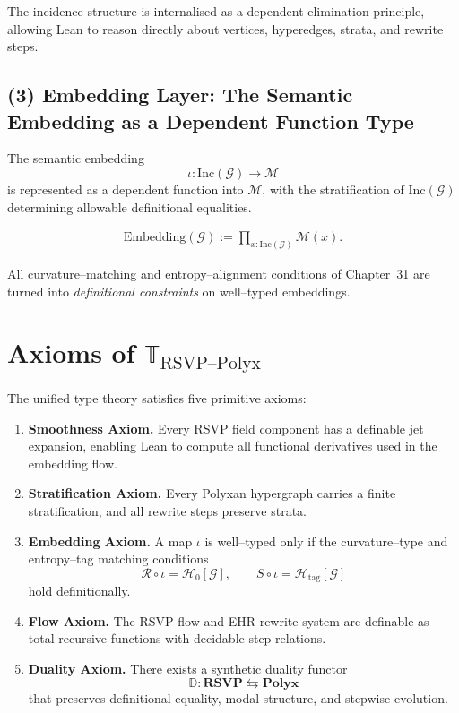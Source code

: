 The incidence structure is internalised as a dependent elimination principle,
allowing Lean to reason directly about vertices, hyperedges, strata, and rewrite steps.

\subsection{(3) Embedding Layer: The Semantic Embedding as a Dependent Function Type}

The semantic embedding
\[
\iota : \mathrm{Inc}(\mathcal{G})\to\mathcal{M}
\]
is represented as a dependent function into $\mathcal{M}$,
with the stratification of $\mathrm{Inc}(\mathcal{G})$ determining allowable definitional equalities.

\begin{align}
\mathrm{Embedding}(\mathcal{G})
  := \prod_{x:\mathrm{Inc}(\mathcal{G})} \mathcal{M}(x).
\end{align}

All curvature--matching and entropy--alignment conditions of Chapter~31
are turned into \emph{definitional constraints} on well--typed embeddings.

\section{Axioms of $\mathbb{T}_{\mathrm{RSVP\text{--}Polyx}}$}

The unified type theory satisfies five primitive axioms:

\begin{enumerate}
\item \textbf{Smoothness Axiom.}  
Every RSVP field component has a definable jet expansion, enabling Lean to compute all functional derivatives used in the embedding flow.

\item \textbf{Stratification Axiom.}  
Every Polyxan hypergraph carries a finite stratification, and all rewrite steps preserve strata.

\item \textbf{Embedding Axiom.}  
A map $\iota$ is well--typed only if the curvature--type and entropy--tag matching conditions
\[
\mathcal{R}\circ\iota = \mathcal{H}_0[\mathcal{G}],\qquad
S\circ\iota = \mathcal{H}_{\mathrm{tag}}[\mathcal{G}]
\]
hold definitionally.

\item \textbf{Flow Axiom.}  
The RSVP flow and EHR rewrite system are definable as total recursive functions with decidable step relations.

\item \textbf{Duality Axiom.}  
There exists a synthetic duality functor
\[
\mathbb{D} : \mathbf{RSVP}\leftrightarrows \mathbf{Polyx}
\]
that preserves definitional equality, modal structure, and stepwise evolution.
\end{enumerate}

